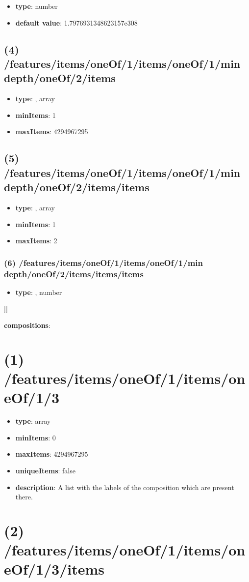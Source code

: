 \begin{itemize}[leftmargin=5em]\item {\bf type}: number\item {\bf default value}: 1.7976931348623157e308
\end{itemize}\subsection{(4) /features/items/oneOf/1/items/oneOf/1/min depth/oneOf/2/items}
\begin{itemize}[leftmargin=4em]\item {\bf type}: , array\item {\bf minItems}: 1
\item {\bf maxItems}: 4294967295
\end{itemize}\subsection{(5) /features/items/oneOf/1/items/oneOf/1/min depth/oneOf/2/items/items}
\begin{itemize}[leftmargin=5em]\item {\bf type}: , array\item {\bf minItems}: 1
\item {\bf maxItems}: 2
\end{itemize}\subsubsection{(6) /features/items/oneOf/1/items/oneOf/1/min depth/oneOf/2/items/items/items}
\begin{itemize}[leftmargin=6em]\item {\bf type}: , number\end{itemize}]]\item {\bf compositions}: \section{(1) /features/items/oneOf/1/items/oneOf/1/3}
\begin{itemize}[leftmargin=1em]\item {\bf type}: array
\item {\bf minItems}: 0
\item {\bf maxItems}: 4294967295
\item {\bf uniqueItems}: false
\item {\bf description}: A list with the labels of the composition which are present there.
\end{itemize}\section{(2) /features/items/oneOf/1/items/oneOf/1/3/items}
